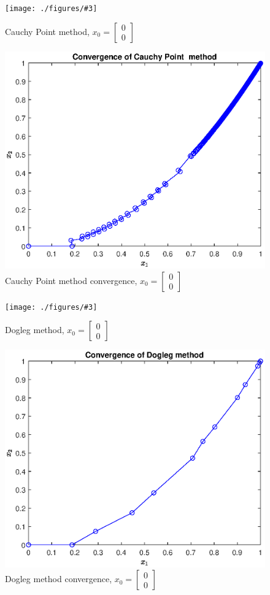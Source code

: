\documentclass[unicode,11pt,a4paper,oneside,numbers=endperiod,openany]{scrartcl}
\newcommand{\myvec}[1]{\begin{bmatrix} #1 \end{bmatrix}}
\newcommand{\myFigureEnergy}[3]{
    \begin{figure}[htbp]
    \centering
    \caption{#1}
    \label{#2}
    \texttt{[image: ./figures/\#3]}
    \end{figure}
}
\begin{document}
\myFigureEnergy{Cauchy Point method, $x_0 = \myvec{0 \\ 0}$}{ex1-cauchy-energy}{ex1-cauchy-energy.eps}
\begin{figure}[htbp]
\centering
\caption{Cauchy Point method convergence, $x_0 = \myvec{0 \\ 0}$}
\label{ex1-cauchy-convergence}
\includegraphics[width=\textwidth, trim={0cm 0cm 0cm 0cm}]{./figures/ex1-cauchy-convergence.eps}
\end{figure}


\myFigureEnergy{Dogleg method, $x_0 = \myvec{0 \\ 0}$}{ex1-dogleg-energy}{ex1-dogleg-energy.eps}
\begin{figure}[htbp]
\centering
\caption{Dogleg method convergence, $x_0 = \myvec{0 \\ 0}$}
\label{ex1-dogleg-convergence}
\includegraphics[width=\textwidth, trim={0cm 0cm 0cm 0cm}]{./figures/ex1-dogleg-convergence.eps}
\end{figure}
\end{document}
